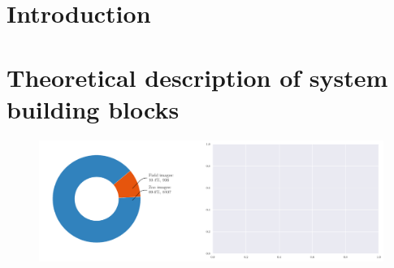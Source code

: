 \documentclass[a4paper,12pt]{report}
\begin{document}












\chapter{ Introduction}


\chapter{ Theoretical description of system building blocks}

\begin{figure}
  \centering
  \includegraphics{test.pdf}
\end{figure}
\end{document}
